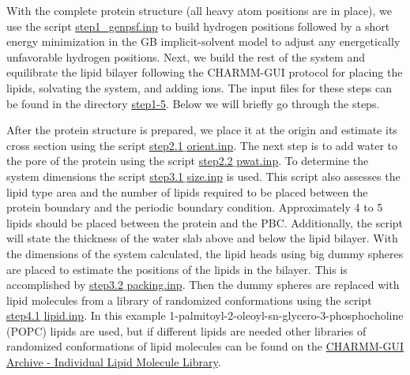 With the complete protein structure (all heavy atom positions
are in place), we use the script
\href{https://gitlab.com/shenlab-amber-cphmd/cphmd-tutorial/-/tree/main/memb_hphmd_charmm/initial_system_prep/step1-5}{step1\_genpsf.inp} to build
hydrogen positions followed by a short energy minimization in the GB implicit-solvent model to adjust any energetically
unfavorable hydrogen positions.
Next, we build the rest of the system and equilibrate the
lipid bilayer
following the CHARMM-GUI protocol for placing the lipids, solvating the system, and adding ions.\cite{Jo_Im_2007_PLoSONE}
The input files for these steps can be found in the directory \href{https://gitlab.com/shenlab-amber-cphmd/cphmd-tutorial/-/tree/main/memb_hphmd_charmm/initial_system_prep/step1-5}{step1-5}.
Below we will briefly go through the steps.

After the protein structure is prepared, we 
place it at the origin and estimate its 
cross section using the script
\href{https://gitlab.com/shenlab-amber-cphmd/cphmd-tutorial/-/tree/main/memb_hphmd_charmm/initial_system_prep/step1-5}{step2.1$\_$orient.inp}. 
The next step is to add water to the pore of the protein 
using the script \href{https://gitlab.com/shenlab-amber-cphmd/cphmd-tutorial/-/tree/main/memb_hphmd_charmm/initial_system_prep/step1-5}{step2.2$\_$pwat.inp}.
To determine the system dimensions the script \href{https://gitlab.com/shenlab-amber-cphmd/cphmd-tutorial/-/tree/main/memb_hphmd_charmm/initial_system_prep/step1-5}{step3.1$\_$size.inp} is used. This script also assesses the lipid type area and the number of lipids required to be placed between the protein boundary and the periodic boundary condition. 
Approximately 4 to 5 lipids should be placed between the protein and the PBC. 
Additionally, the script will state the thickness of the water slab above and below the lipid bilayer. 
With the dimensions of the system calculated, the lipid heads using big dummy spheres are placed to estimate the positions of the lipids in the bilayer. This is accomplished by \href{https://gitlab.com/shenlab-amber-cphmd/cphmd-tutorial/-/tree/main/memb_hphmd_charmm/initial_system_prep/step1-5}{step3.2$\_$packing.inp}.
Then the dummy spheres are replaced with lipid molecules from a library of randomized conformations using the script \href{https://gitlab.com/shenlab-amber-cphmd/cphmd-tutorial/-/tree/main/memb_hphmd_charmm/initial_system_prep/step1-5}{step4.1$\_$lipid.inp}.
In this example 1-palmitoyl-2-oleoyl-sn-glycero-3-phosphocholine (POPC) lipids are used, but if different lipids are needed other libraries of randomized conformations of lipid molecules can be found on the \href{https://www.charmm-gui.org/?doc=archive&lib=lipid}{CHARMM-GUI Archive - Individual Lipid Molecule Library}.

